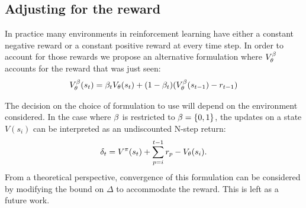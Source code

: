 \subsection{Adjusting for the reward}
In practice many environments in reinforcement learning have either a constant negative reward or a constant positive reward at every time step. In order to account for those rewards we propose an alternative formulation where $V^{\beta}_{\theta}$ accounts for the reward that was just seen:
\begin{equation}
\label{value_reward}
    V^{\beta}_{\theta}(s_t) = \beta_t V_{\theta}(s_t) + (1 - \beta_t) (V^{\beta}_{\theta}(s_{t-1}) - r_{t-1}) 
\end{equation}

The decision on the choice of formulation to use will depend on the environment considered. In the case where $\beta$ is restricted to $\beta = \{0,1\}$, the updates on a state $V(s_i)$ can be interpreted as an undiscounted N-step return:
\begin{equation}\label{undiscounted}
        \delta_t = V^{\pi}(s_t) + \sum_{p=i}^{t-1} r_p - V_{\theta}(s_i).
\end{equation}
From a theoretical perspective, convergence of this formulation can be considered by modifying the bound on $\Delta$ to accommodate the reward. This is left as a future work. 

